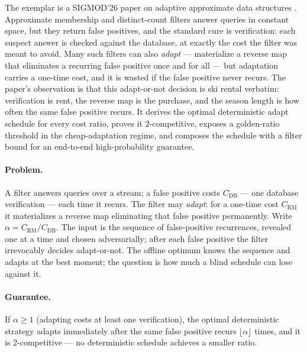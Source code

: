 The exemplar is a SIGMOD'26 paper on adaptive approximate data structures
\citep{sigmod26-242}. Approximate membership and distinct-count filters answer
queries in constant space, but they return false positives, and the standard
cure is verification: each suspect answer is checked against the database, at
exactly the cost the filter was meant to avoid. Many such filters can also
\emph{adapt} --- materialize a reverse map that eliminates a recurring false
positive once and for all --- but adaptation carries a one-time cost, and it is
wasted if the false positive never recurs. The paper's observation is that this
adapt-or-not decision is ski rental verbatim: verification is rent, the reverse
map is the purchase, and the season length is how often the same false positive
recurs. It derives the optimal deterministic adapt schedule for every cost
ratio, proves it $2$-competitive, exposes a golden-ratio threshold in the
cheap-adaptation regime, and composes the schedule with a filter bound for an
end-to-end high-probability guarantee.

\paragraph{Problem.}
A filter answers queries over a stream; a false positive costs
$C_{\mathrm{DB}}$ --- one database verification --- each time it recurs. The
filter may \emph{adapt}: for a one-time cost $C_{\mathrm{RM}}$ it materializes
a reverse map eliminating that false positive permanently. Write
$\alpha = C_{\mathrm{RM}}/C_{\mathrm{DB}}$. The input is the sequence of
false-positive recurrences, revealed one at a time and chosen adversarially;
after each false positive the filter irrevocably decides adapt-or-not. The
offline optimum knows the sequence and adapts at the best moment; the question
is how much a blind schedule can lose against it.

\paragraph{Guarantee.}

\begin{theorem}
\label{thm:onl-ski-thm1}
If $\alpha \ge 1$ (adapting costs at least one verification), the optimal
deterministic strategy adapts immediately after the same false positive recurs
$\lfloor\alpha\rfloor$ times, and it is $2$-competitive --- no deterministic
schedule achieves a smaller ratio. \eop
\end{theorem}

